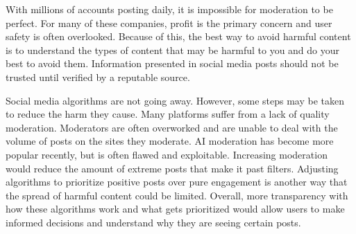 \documentclass[conference]{IEEEtran}
\begin{document}
With millions of accounts posting daily, it is impossible for moderation to be perfect. For many of these companies, profit is the primary concern and user safety is often overlooked. Because of this, the best way to avoid harmful content is to understand the types of content that may be harmful to you and do your best to avoid them. Information presented in social media posts should not be trusted until verified by a reputable source.

Social media algorithms are not going away. However, some steps may be taken to reduce the harm they cause. Many platforms suffer from a lack of quality moderation. Moderators are often overworked and are unable to deal with the volume of posts on the sites they moderate. AI moderation has become more popular recently, but is often flawed and exploitable. Increasing moderation would reduce the amount of extreme posts that make it past filters. Adjusting algorithms to prioritize positive posts over pure engagement is another way that the spread of harmful content could be limited. Overall, more transparency with how these algorithms work and what gets prioritized would allow users to make informed decisions and understand why they are seeing certain posts. 

\vspace{4\baselineskip}\vspace{-\parskip}
\footnotesize
 

\end{document}
